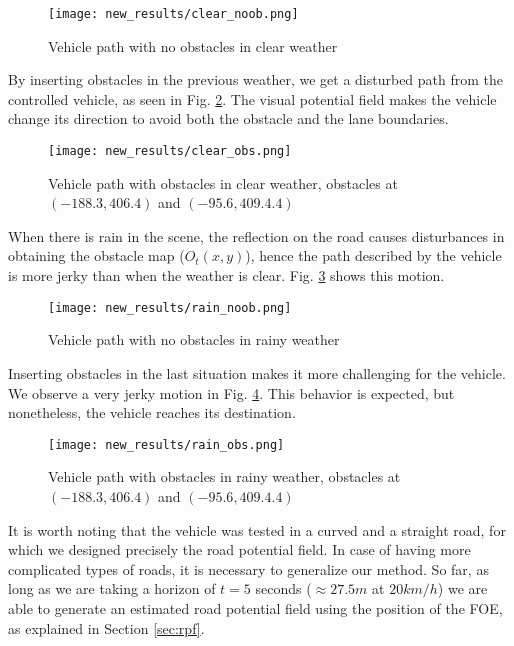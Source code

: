 \documentclass[letterpaper, 10 pt, conference]{ieeeconf}  %
\begin{document}
\begin{figure}[h!]
\centering
\texttt{[image: new\_results/clear\_noob.png]}
\caption{Vehicle path with no obstacles in clear weather}
\label{fig:noon_noobs}
\end{figure}

By inserting obstacles in the previous weather, we get a disturbed path from the controlled vehicle, as seen in Fig. \ref{fig:noon_obs}. The visual potential field makes the vehicle change its direction to avoid both the obstacle and the lane boundaries.

\begin{figure}[h!]
\centering
\texttt{[image: new\_results/clear\_obs.png]}
\caption{Vehicle path with obstacles in clear weather, obstacles at $(-188.3,406.4)$ and $(-95.6,409.4.4)$}
\label{fig:noon_obs}
\end{figure}

When there is rain in the scene, the reflection on the road causes disturbances in obtaining the obstacle map ($O_t(x,y)$), hence the path described by the vehicle is more jerky than when the weather is clear. Fig. \ref{fig:rain_noobs} shows this motion.

\begin{figure}[h!]
\centering
\texttt{[image: new\_results/rain\_noob.png]}
\caption{Vehicle path with no obstacles in rainy weather}
\label{fig:rain_noobs}
\end{figure}

Inserting obstacles in the last situation makes it more challenging for the vehicle. We observe a very jerky motion in Fig. \ref{fig:rain_obs}. This behavior is expected, but nonetheless, the vehicle reaches its destination. 

\begin{figure}[h!]
\centering
\texttt{[image: new\_results/rain\_obs.png]}
\caption{Vehicle path with obstacles in rainy weather, obstacles at $(-188.3,406.4)$ and $(-95.6,409.4.4)$}
\label{fig:rain_obs}
\end{figure}

It is worth noting that the vehicle was tested in a curved and a straight road, for which we designed precisely the road potential field. In case of having more complicated types of roads, it is necessary to generalize our method. So far, as long as we are taking a horizon of $t = 5$ seconds ($\approx 27.5 m$ at $20 km/h$) we are able to generate an estimated road potential field using the position of the FOE, as explained in Section \ref{sec:rpf}.
\end{document}

